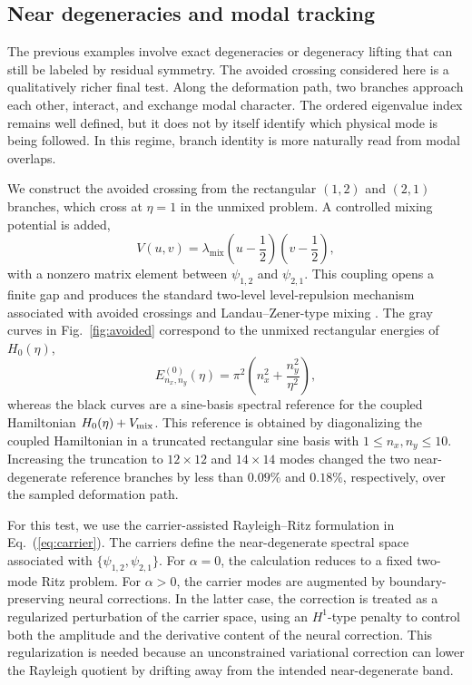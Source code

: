\documentclass[10pt,onecolumn]{article}
\begin{document}
\subsection{Near degeneracies and modal tracking}

The previous examples involve exact degeneracies or degeneracy lifting that can still be labeled by residual symmetry. The avoided crossing considered here is a qualitatively richer final test. Along the deformation path, two branches approach each other, interact, and exchange modal character. The ordered eigenvalue index remains well defined, but it does not by itself identify which physical mode is being followed. In this regime, branch identity is more naturally read from modal overlaps.

We construct the avoided crossing from the rectangular $(1,2)$ and $(2,1)$ branches, which cross at $\eta=1$ in the unmixed problem. A controlled mixing potential is added,
\begin{equation}
V(u,v)=
\lambda_{\mathrm{mix}}
\left(u-\frac{1}{2}\right)
\left(v-\frac{1}{2}\right),
\label{eq:mixing}
\end{equation}
with a nonzero matrix element between $\psi_{1,2}$ and $\psi_{2,1}$. This coupling opens a finite gap and produces the standard two-level level-repulsion mechanism associated with avoided crossings and Landau--Zener-type mixing \cite{VonNeumannWigner1929,Zener1932}. The gray curves in Fig.~\ref{fig:avoided} correspond to the unmixed rectangular energies of $H_0(\eta)$,
\begin{equation}
E_{n_x,n_y}^{(0)}(\eta)
=
\pi^2
\left(
n_x^2+\frac{n_y^2}{\eta^2}
\right),
\end{equation}
whereas the black curves are a sine-basis spectral reference for the coupled Hamiltonian $H_0(\eta)+V_{\rm mix}$. This reference is obtained by diagonalizing the coupled Hamiltonian in a truncated rectangular sine basis with $1\le n_x,n_y\le 10$. Increasing the truncation to $12\times12$ and $14\times14$ modes changed the two near-degenerate reference branches by less than $0.09\%$ and $0.18\%$, respectively, over the sampled deformation path.

For this test, we use the carrier-assisted Rayleigh--Ritz formulation in Eq.~(\ref{eq:carrier}). The carriers define the near-degenerate spectral space associated with $\{\psi_{1,2},\psi_{2,1}\}$. For $\alpha=0$, the calculation reduces to a fixed two-mode Ritz problem. For $\alpha>0$, the carrier modes are augmented by boundary-preserving neural corrections. In the latter case, the correction is treated as a regularized perturbation of the carrier space, using an $H^1$-type penalty to control both the amplitude and the derivative content of the neural correction. This regularization is needed because an unconstrained variational correction can lower the Rayleigh quotient by drifting away from the intended near-degenerate band.
\end{document}
